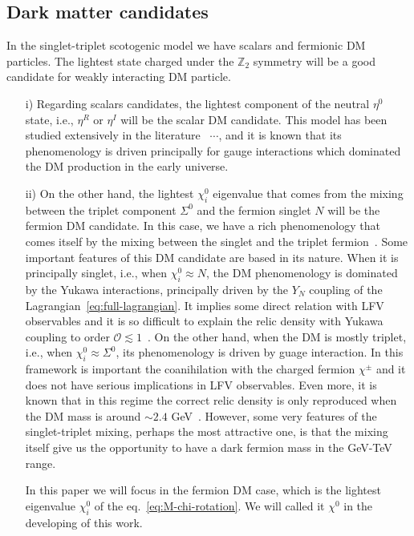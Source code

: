 \documentclass[12pt,letterpaper]{article}
\begin{document}
\subsection{Dark matter candidates}
\label{sec:dark-matter}

In the singlet-triplet scotogenic model we have scalars and fermionic DM particles. The lightest state charged under the $\mathbb{Z}_2$ symmetry will be a good candidate for weakly interacting DM particle. 
\begin{enumerate}
\item[i)] Regarding scalars candidates, the lightest component of the neutral $\eta^0$ state, i.e., $\eta^R$ or $\eta^I$ will be the scalar DM candidate. 
This model has been studied extensively in the literature~\cite{Deshpande:1977rw} $\cdots$, and it is known that its phenomenology is driven principally for gauge interactions which dominated the DM production in the early universe. 
%
\item[ii)] On the other hand, the lightest $\chi_i^0$ eigenvalue that comes from the mixing between the triplet component $\Sigma^0$ and the fermion singlet $N$ will be the fermion DM candidate. In this case, we have a rich phenomenology that comes itself by the mixing between the singlet and the triplet fermion~\cite{Hirsch:2013ola, Rocha-Moran:2016enp, Merle:2016scw}.
Some important features of this DM candidate are based in its nature. When it is principally singlet, i.e., when $\chi_i^0\approx N$, the DM phenomenology is dominated by the Yukawa interactions, principally driven by the $Y_N$ coupling of the Lagrangian~\ref{eq:full-lagrangian}. It implies some direct relation with LFV observables and it is so difficult to explain the relic density with Yukawa coupling to order $\mathcal{O}\lesssim 1$~\cite{Ibarra:2016dlb}. 
On the other hand, when the DM is mostly triplet, i.e., when $\chi_i^0\approx \Sigma^0$, its phenomenology is driven by guage interaction. In this framework is important the coanihilation with the charged fermion $\chi^{\pm}$ and it does not have serious implications in LFV observables. Even more, it is known that in this regime the correct relic density is only reproduced when the DM mass is around $\sim 2.4$ GeV~\cite{Ma:2008cu}. However, some very features of the singlet-triplet mixing, perhaps the most attractive one, is that the mixing itself give us the opportunity to have a dark fermion mass in the GeV-TeV range.   

In this paper we will focus in the fermion DM case, which is the lightest eigenvalue $\chi_i^0$ of the eq.~\ref{eq:M-chi-rotation}. We will called it $\chi^0$ in the developing of this work. 
\end{enumerate}
\end{document}
